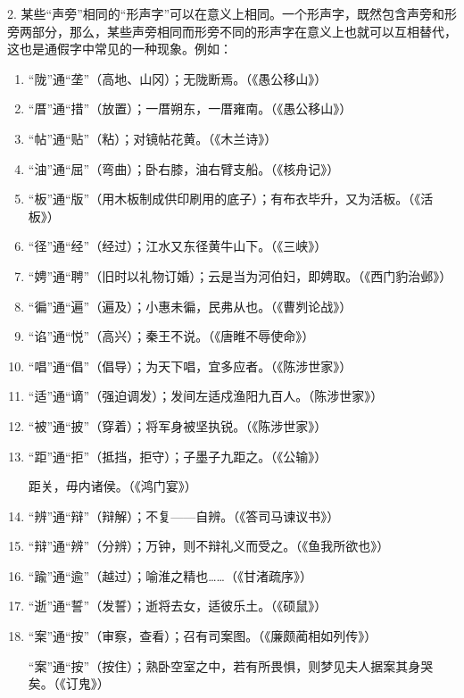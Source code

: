 2. 某些“声旁”相同的“形声字”可以在意义上相同。一个形声字，既然包含声旁和形旁两部分，那么，某些声旁相同而形旁不同的形声字在意义上也就可以互相替代，这也是通假字中常见的一种现象。例如：
\begin{enumerate}[label=\textcircled{\arabic*}]
\item “陇”通“垄”（高地、山冈）；无陇断焉。（《愚公移山》）
\item “厝”通“措”（放置）；一厝朔东，一厝雍南。（《愚公移山》）
\item “帖”通“贴”（粘）；对镜帖花黄。（《木兰诗》）
\item “油”通“屈”（弯曲）；卧右膝，油右臂支船。（《核舟记》）
\item “板”通“版”（用木板制成供印刷用的底子）；有布衣毕升，又为活板。（《活板》）
\item “径”通“经”（经过）；江水又东径黄牛山下。（《三峡》）
\item “娉”通“聘”（旧时以礼物订婚）；云是当为河伯妇，即娉取。（《西门豹治邺》）
\item “徧”通“遍”（遍及）；小惠未徧，民弗从也。（《曹刿论战》）
\item “谄”通“悦”（高兴）；秦王不说。（《唐睢不辱使命》）
\item “唱”通“倡”（倡导）；为天下唱，宜多应者。（《陈涉世家》）
\item “适”通“谪”（强迫调发）；发间左适戍渔阳九百人。（陈涉世家》）
\item “被”通“披”（穿着）；将军身被坚执锐。（《陈涉世家》）
\item “距”通“拒”（抵挡，拒守）；子墨子九距之。（《公输》）

距关，毋内诸侯。（《鸿门宴》）

\item “辨”通“辩”（辩解）；不复——自辨。（《答司马谏议书》）
\item “辩”通“辨”（分辨）；万钟，则不辩礼义而受之。（《鱼我所欲也》）
\item “踰”通“逾”（越过）；喻淮之精也……（《甘渚疏序》）
\item “逝”通“誓”（发誓）；逝将去女，适彼乐土。（《硕鼠》）
\item “案”通“按”（审察，查看）；召有司案图。（《廉颇蔺相如列传》）

 “案”通“按”（按住）；熟卧空室之中，若有所畏惧，则梦见夫人据案其身哭矣。（《订鬼》）
 

\end{enumerate}
